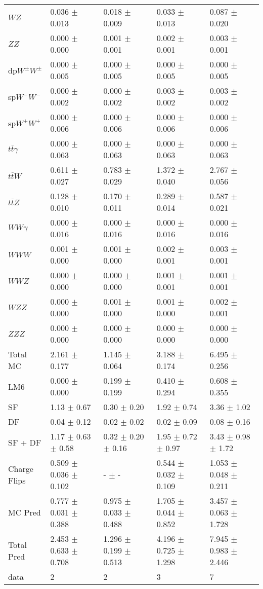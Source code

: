 \begin{tabular}{l | l l l l}
$WZ$ &  0.036 $\pm$  0.013 &  0.018 $\pm$  0.009 &  0.033 $\pm$  0.013 &  0.087 $\pm$  0.020\\
$ZZ$ &   0.000 $\pm$   0.000 &  0.001 $\pm$  0.001 &  0.002 $\pm$  0.001 &  0.003 $\pm$  0.001\\
\hline
dp$W^{\pm}W^{\pm}$ &  0.000 $\pm$  0.005 &  0.000 $\pm$  0.005 &  0.000 $\pm$  0.005 &  0.000 $\pm$  0.005\\
sp$W^{-}W^{-}$ &  0.000 $\pm$  0.002 &  0.000 $\pm$  0.002 &  0.003 $\pm$  0.002 &  0.003 $\pm$  0.002\\
sp$W^{+}W^{+}$ &  0.000 $\pm$  0.006 &  0.000 $\pm$  0.006 &  0.000 $\pm$  0.006 &  0.000 $\pm$  0.006\\
$t\overline{t}\gamma$ &  0.000 $\pm$  0.063 &  0.000 $\pm$  0.063 &  0.000 $\pm$  0.063 &  0.000 $\pm$  0.063\\
$t\overline{t}W$ &  0.611 $\pm$  0.027 &  0.783 $\pm$  0.029 &  1.372 $\pm$  0.040 &  2.767 $\pm$  0.056\\
$t\overline{t}Z$ &  0.128 $\pm$  0.010 &  0.170 $\pm$  0.011 &  0.289 $\pm$  0.014 &  0.587 $\pm$  0.021\\
$WW\gamma$ &  0.000 $\pm$  0.016 &  0.000 $\pm$  0.016 &  0.000 $\pm$  0.016 &  0.000 $\pm$  0.016\\
$WWW$ &  0.001 $\pm$   0.000 &  0.001 $\pm$   0.000 &  0.002 $\pm$  0.001 &  0.003 $\pm$  0.001\\
$WWZ$ &   0.000 $\pm$   0.000 &   0.000 $\pm$   0.000 &  0.001 $\pm$  0.001 &  0.001 $\pm$  0.001\\
$WZZ$ &   0.000 $\pm$   0.000 &  0.001 $\pm$   0.000 &  0.001 $\pm$   0.000 &  0.002 $\pm$  0.001\\
$ZZZ$ &   0.000 $\pm$   0.000 &   0.000 $\pm$   0.000 &   0.000 $\pm$   0.000 &   0.000 $\pm$   0.000\\
\hline
Total MC &  2.161 $\pm$  0.177 &  1.145 $\pm$  0.064 &  3.188 $\pm$  0.174 &  6.495 $\pm$  0.256\\
\hline\hline
\hline
LM6 &  0.000 $\pm$  0.000 &  0.199 $\pm$  0.199 &  0.410 $\pm$  0.294 &  0.608 $\pm$  0.355\\
\hline\hline
\hline\hline
 SF  & 1.13 $\pm$ 0.67 & 0.30 $\pm$ 0.20 & 1.92 $\pm$ 0.74 & 3.36 $\pm$ 1.02\\
 DF  & 0.04 $\pm$ 0.12 & 0.02 $\pm$ 0.02 & 0.02 $\pm$ 0.09 & 0.08 $\pm$ 0.16\\
\hline
 SF + DF  & 1.17 $\pm$ 0.63 $\pm$ 0.58 & 0.32 $\pm$ 0.20 $\pm$ 0.16 & 1.95 $\pm$ 0.72 $\pm$ 0.97 & 3.43 $\pm$ 0.98 $\pm$ 1.72\\
\hline\hline
Charge Flips & 0.509 $\pm$ 0.036 $\pm$ 0.102 & - $\pm$ - & 0.544 $\pm$ 0.032 $\pm$ 0.109 & 1.053 $\pm$ 0.048 $\pm$ 0.211\\
\hline\hline
\hline
MC Pred &  0.777 $\pm$  0.031 $\pm$  0.388 &  0.975 $\pm$  0.033 $\pm$  0.488 &  1.705 $\pm$  0.044 $\pm$  0.852 &  3.457 $\pm$  0.063 $\pm$  1.728\\
\hline\hline
Total Pred &  2.453 $\pm$  0.633 $\pm$  0.708 &  1.296 $\pm$  0.199 $\pm$  0.513 &  4.196 $\pm$  0.725 $\pm$  1.298 &  7.945 $\pm$  0.983 $\pm$  2.446\\
\hline\hline
data & 2 & 2 & 3 & 7\\
\hline\hline
\end{tabular}
